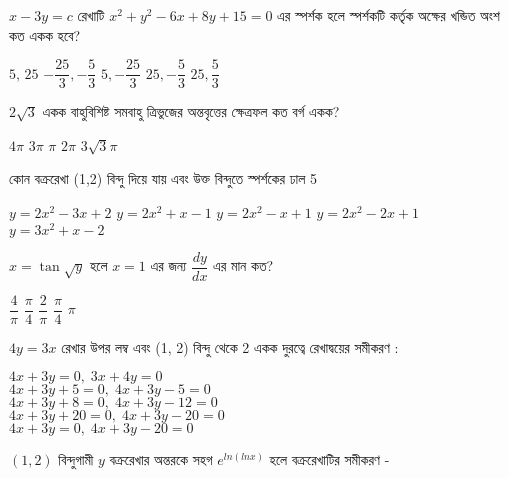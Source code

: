 \documentclass[addpoints]{exam}
\begin{document}
\begin{questions}
\question $ x-3y=c $ রেখাটি $ x^{2}+y^{2}-6x+8y+15=0 $ এর স্পর্শক হলে স্পর্শকটি কর্তৃক অক্ষের খন্ডিত অংশ কত একক হবে?

\begin{oneparchoices}
\choice $ 5,\,25 $
\choice $ -\dfrac{25}{3}, -\dfrac{5}{3} $
\choice $ 5, -\dfrac{25}{3} $
\choice $ 25 , -\dfrac{5}{3} $
\choice $ 25, \dfrac{5}{3} $
\end{oneparchoices}

\question  $ 2\sqrt{3} $ একক বাহুবিশিষ্ট সমবাহু ত্রিভুজের অন্তবৃত্তের ক্ষেত্রফল কত বর্গ একক?

\begin{oneparchoices}
\choice  $ 4\pi $
\choice  $ 3\pi $
\choice  $ \pi $
\choice $ 2\pi $
\choice  $ 3\sqrt{3}\pi $
\end{oneparchoices}

\question   কোন বক্ররেখা (1,2) বিন্দু দিয়ে যায় এবং উক্ত বিন্দুতে স্পর্শকের ঢাল 5

\begin{oneparchoices}
\choice $ y = 2x^{2}-3x+2 $
\choice $ y = 2x^{2}+x-1 $
\choice $ y = 2x^{2} - x + 1 $
\choice $ y = 2x^{2} - 2x+1 $
\choice $ y = 3x^{2} + x - 2 $
\end{oneparchoices}

\question  $ x = \tan\sqrt{y} $ হলে $ x=1 $ এর জন্য $ \dfrac{dy}{dx} $ এর মান কত?

\begin{oneparchoices}
\choice $ \dfrac{4}{\pi} $ 
\choice $ \dfrac{\pi}{4} $ 
\choice $ \dfrac{2}{\pi} $ 
\choice $ \dfrac{\pi}{4} $
\choice $ \pi $ 
\end{oneparchoices}

\question  $ 4y = 3x $ রেখার উপর লম্ব এবং (1, 2) বিন্দু থেকে 2 একক দুরত্বে রেখাদ্বয়ের সমীকরণ :

\begin{oneparchoices}
\choice $ 4x+3y=0,\; 3x+4y=0 $\\

\choice $ 4x+3y + 5=0,\; 4x+3y-5=0 $\\

\choice $ 4x+3y+8=0,\; 4x+3y-12=0 $\\

\choice $ 4x+3y+20=0,\; 4x+3y-20=0 $\\

\choice $ 4x+3y=0,\; 4x+3y-20=0 $
\end{oneparchoices}

\question $ (1,2) $ বিন্দুগামী $ y $ বক্ররেখার অন্তরকে সহগ $ e^{ln(ln x)} $ হলে বক্ররেখাটির সমীকরণ - 


\end{questions}
\end{document}
